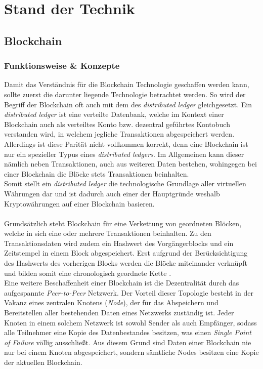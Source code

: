 \chapter{Stand der Technik}
\label{kap:Kapitel02}
%
       
%
\section{Blockchain}
\subsection{Funktionsweise \& Konzepte}
Damit das Verständnis für die Blockchain Technologie geschaffen werden kann, sollte zuerst die darunter liegende Technologie betrachtet werden. 
So wird der Begriff der Blockchain oft auch mit dem des \textit{distributed ledger} gleichgesetzt. Ein \textit{distributed ledger} ist eine verteilte Datenbank, welche im Kontext einer Blockchain auch als verteiltes Konto bzw. dezentral geführtes Kontobuch \cite{DL:bafin} verstanden wird, in welchem jegliche Transaktionen abgespeichert werden.\\
Allerdings ist diese Pa­ri­tät nicht vollkommen korrekt, denn eine Blockchain ist nur ein spezieller Typus eines \textit{distributed ledgers}. Im Allgemeinen kann dieser nämlich neben Transaktionen, auch aus weiteren Daten bestehen, wohingegen bei einer Blockchain die Blöcke stets Transaktionen beinhalten. \\
Somit stellt ein \textit{distributed ledger} die technologische Grundlage aller virtuellen Währungen dar und ist dadurch auch einer der Hauptgründe weshalb Kryptowährungen auf einer Blockchain basieren.\\\\
Grundsätzlich steht Blockchain für eine Verkettung von geordneten Blöcken, welche in sich eine oder mehrere Transaktionen beinhalten. 
Zu den Transaktionsdaten wird zudem ein Hashwert des Vorgängerblocks und ein Zeitstempel in einem Block abgespeichert. Erst aufgrund der Berücksichtigung des Hashwerts des vorherigen Blocks werden die Blöcke miteinander verknüpft und bilden somit eine chronologisch geordnete Kette \cite{MasteringBlockchain}.\\
Eine weitere Beschaffenheit einer Blockchain ist die Dezentralität durch das aufgespannte \textit{Peer-to-Peer} Netzwerk. Der Vorteil dieser Topologie besteht in der Vakanz eines zentralen Knotens (\textit{Node}), der für das Abspeichern und Bereitstellen aller bestehenden Daten eines Netzwerks zuständig ist. Jeder Knoten in einem solchem Netzwerk ist sowohl Sender als auch Empfänger, sodass alle Teilnehmer eine Kopie des Datenbestandes besitzen, was einen \textit{Single Point of Failure} völlig ausschließt. Aus diesem Grund sind Daten einer Blockchain nie nur bei einem Knoten abgespeichert, sondern sämtliche Nodes besitzen eine Kopie der aktuellen Blockchain.\\\\
